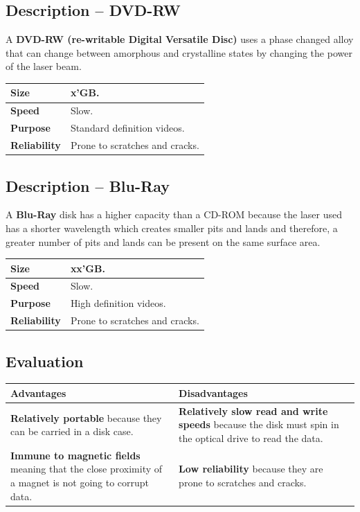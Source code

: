 \documentclass[a4paper]{systems-software}
\begin{document}
\subsection*{Description -- DVD-RW}

A \textbf{DVD-RW (re-writable Digital Versatile Disc)} uses a phase changed alloy that can change between amorphous and crystalline states by changing the power of the laser beam.

\begin{longtabu} to \textwidth {| X[1,l] | X[6,l] |}
    \hline
    \textbf{Size} & x'GB.
	\\ \hline
	\textbf{Speed} & Slow.
	\\ \hline
	\textbf{Purpose} & Standard definition videos.
	\\ \hline
	\textbf{Reliability} & Prone to scratches and cracks.
	\\ \hline
\end{longtabu}


\subsection*{Description -- Blu-Ray}

A \textbf{Blu-Ray} disk has a higher capacity than a CD-ROM because the laser used has a shorter wavelength which creates smaller pits and lands and therefore, a greater number of pits and lands can be present on the same surface area.

\begin{longtabu} to \textwidth {| X[1,l] | X[6,l] |}
    \hline
    \textbf{Size} & xx'GB.
	\\ \hline
	\textbf{Speed} & Slow.
	\\ \hline
	\textbf{Purpose} & High definition videos.
	\\ \hline
	\textbf{Reliability} & Prone to scratches and cracks.
	\\ \hline
\end{longtabu}


\subsection*{Evaluation}

\begin{longtabu} to \textwidth {| X[1,l] | X[1,l] |}
    \hline
    \textbf{Advantages} & \textbf{Disadvantages}
	\\ \hline
	\textbf{Relatively portable} because they can be carried in a disk case. & \textbf{Relatively slow read and write speeds} because the disk must spin in the optical drive to read the data.
	\\ \hline
	\textbf{Immune to magnetic fields} meaning that the close proximity of a magnet is not going to corrupt data. & \textbf{Low reliability} because they are prone to scratches and cracks.
	\\ \hline
\end{longtabu}
\end{document}
